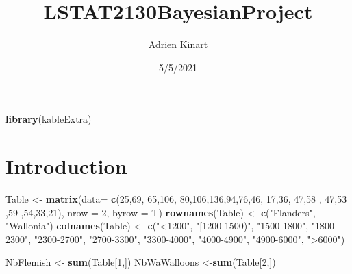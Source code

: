 \documentclass[
]{article}
\title{LSTAT2130BayesianProject}
\author{Adrien Kinart}
\date{5/5/2021}
\newenvironment{Shaded}{\begin{snugshade}}{\end{snugshade}}
\newcommand{\DataTypeTok}[1]{\textcolor[rgb]{0.13,0.29,0.53}{#1}}
\newcommand{\DecValTok}[1]{\textcolor[rgb]{0.00,0.00,0.81}{#1}}
\newcommand{\KeywordTok}[1]{\textcolor[rgb]{0.13,0.29,0.53}{\textbf{#1}}}
\newcommand{\NormalTok}[1]{#1}
\newcommand{\StringTok}[1]{\textcolor[rgb]{0.31,0.60,0.02}{#1}}
\begin{document}
\maketitle

{
\setcounter{tocdepth}{3}
\tableofcontents
}
\begin{Shaded}
\begin{Highlighting}[]
\KeywordTok{library}\NormalTok{(kableExtra)}
\end{Highlighting}
\end{Shaded}

\hypertarget{introduction}{%
\section{Introduction}\label{introduction}}

\begin{Shaded}
\begin{Highlighting}[]
\NormalTok{Table <-}\StringTok{ }\KeywordTok{matrix}\NormalTok{(}\DataTypeTok{data=} \KeywordTok{c}\NormalTok{(}\DecValTok{25}\NormalTok{,}\DecValTok{69}\NormalTok{, }\DecValTok{65}\NormalTok{,}\DecValTok{106}\NormalTok{, }\DecValTok{80}\NormalTok{,}\DecValTok{106}\NormalTok{,}\DecValTok{136}\NormalTok{,}\DecValTok{94}\NormalTok{,}\DecValTok{76}\NormalTok{,}\DecValTok{46}\NormalTok{,}
                       \DecValTok{17}\NormalTok{,}\DecValTok{36}\NormalTok{, }\DecValTok{47}\NormalTok{,}\DecValTok{58}\NormalTok{ , }\DecValTok{47}\NormalTok{,}\DecValTok{53}\NormalTok{ ,}\DecValTok{59}\NormalTok{ ,}\DecValTok{54}\NormalTok{,}\DecValTok{33}\NormalTok{,}\DecValTok{21}\NormalTok{),}
                \DataTypeTok{nrow =} \DecValTok{2}\NormalTok{, }\DataTypeTok{byrow =}\NormalTok{ T)}
\KeywordTok{rownames}\NormalTok{(Table) <-}\StringTok{ }\KeywordTok{c}\NormalTok{(}\StringTok{"Flanders"}\NormalTok{, }\StringTok{"Wallonia"}\NormalTok{) }
\KeywordTok{colnames}\NormalTok{(Table) <-}\StringTok{ }\KeywordTok{c}\NormalTok{(}\StringTok{"<1200"}\NormalTok{, }\StringTok{"[1200-1500)"}\NormalTok{, }\StringTok{"1500-1800"}\NormalTok{, }\StringTok{"1800-2300"}\NormalTok{, }\StringTok{"2300-2700"}\NormalTok{,}
                     \StringTok{"2700-3300"}\NormalTok{, }\StringTok{"3300-4000"}\NormalTok{, }\StringTok{"4000-4900"}\NormalTok{, }\StringTok{"4900-6000"}\NormalTok{, }\StringTok{">6000"}\NormalTok{)}

\NormalTok{NbFlemish <-}\StringTok{  }\KeywordTok{sum}\NormalTok{(Table[}\DecValTok{1}\NormalTok{,])}
\NormalTok{NbWaWalloons <-}\KeywordTok{sum}\NormalTok{(Table[}\DecValTok{2}\NormalTok{,])  }
\end{Highlighting}
\end{Shaded}
\end{document}
